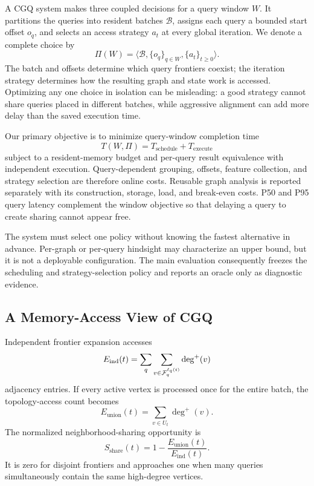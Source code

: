 A CGQ system makes three coupled decisions for a query window $W$.  It partitions the queries into resident batches $\mathcal{B}$, assigns each query a bounded start offset $o_q$, and selects an access strategy $a_t$ at every global iteration.  We denote a complete choice by
\begin{equation}
  \Pi(W)=\langle\mathcal{B},\{o_q\}_{q\in W},\{a_t\}_{t\geq 0}\rangle.
\end{equation}
The batch and offsets determine which query frontiers coexist; the iteration strategy determines how the resulting graph and state work is accessed.  Optimizing any one choice in isolation can be misleading: a good strategy cannot share queries placed in different batches, while aggressive alignment can add more delay than the saved execution time.

Our primary objective is to minimize query-window completion time
\begin{equation}
  T(W,\Pi)=T_{\mathrm{schedule}}+T_{\mathrm{execute}}
  \label{eq:window-objective}
\end{equation}
subject to a resident-memory budget and per-query result equivalence with independent execution.  Query-dependent grouping, offsets, feature collection, and strategy selection are therefore online costs.  Reusable graph analysis is reported separately with its construction, storage, load, and break-even costs.  P50 and P95 query latency complement the window objective so that delaying a query to create sharing cannot appear free.

The system must select one policy without knowing the fastest alternative in advance.  Per-graph or per-query hindsight may characterize an upper bound, but it is not a deployable configuration.  The main evaluation consequently freezes the scheduling and strategy-selection policy and reports an oracle only as diagnostic evidence.

\subsection{A Memory-Access View of CGQ}

Independent frontier expansion accesses
\begin{equation}
  E_{\mathrm{ind}}(t)=
    \sum_q\sum_{v\in\mathcal{F}_q^{\ell_q(t)}}\deg^+(v)
\end{equation}
adjacency entries.  If every active vertex is processed once for the entire batch, the topology-access count becomes
\begin{equation}
  E_{\mathrm{union}}(t)=\sum_{v\in U_t}\deg^+(v).
\end{equation}
The normalized neighborhood-sharing opportunity is
\begin{equation}
  S_{\mathrm{share}}(t)=1-\frac{E_{\mathrm{union}}(t)}
                                    {E_{\mathrm{ind}}(t)}.
\end{equation}
It is zero for disjoint frontiers and approaches one when many queries simultaneously contain the same high-degree vertices.

